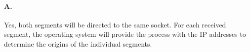 \paragraph{A.}
Yes, both segments will be directed to the same socket. For each received segment, the operating system will provide the process with the IP addresses to determine the origins of the individual segments.